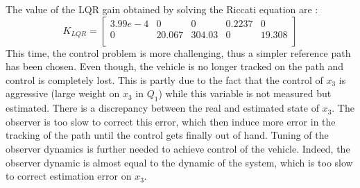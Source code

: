 The value of the LQR gain obtained by solving the Riccati equation are :
\begin{equation}
    K_{LQR} = 
    \left[ {\begin{array}{ccccc}
         3.99e-4 &0       &0       &0.2237 &0      \\
         0         &20.067 &304.03 &0      &19.308 \\
    \end{array}}\right]
\end{equation}
This time, the control problem is more challenging, thus a simpler reference path has been chosen. Even though, the vehicle is no longer tracked on the path and control is completely lost. This is partly due to the fact that the control of $x_3$ is aggressive (large weight on $x_3$ in $Q_1$) while this variable is not measured but estimated. There is a discrepancy between the real and estimated state of $x_3$. The observer is too slow to correct this error, which then induce more error in the tracking of the path until the control gets finally out of hand. Tuning of the observer dynamics is further needed to achieve control of the vehicle. Indeed, the observer dynamic is almost equal to the dynamic of the system, which is too slow to correct estimation error on $x_3$.

